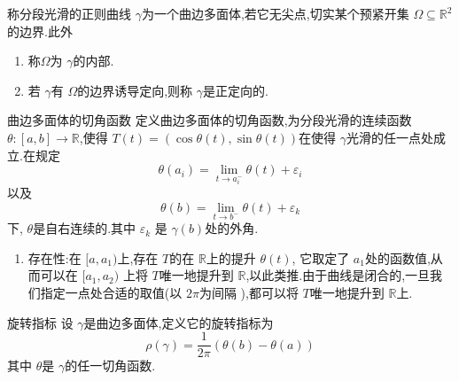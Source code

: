 \documentclass[../../main.tex]{subfiles}
\begin{document}
\begin{definition}
    称分段光滑的正则曲线 \(   \gamma   \)为一个曲边多面体,若它无尖点,切实某个预紧开集 \(   \Omega \subseteq \mathbb{R} ^{2}  \)  的边界.此外
    \begin{enumerate}
        \item 称\(    \Omega   \)为 \(   \gamma   \)的内部.  
        \item 若 \(   \gamma   \)有 \(   \Omega   \)的边界诱导定向,则称 \(   \gamma   \)是正定向的.   
    \end{enumerate}
    
\end{definition}


\begin{definition}{曲边多面体的切角函数}
    定义曲边多面体的切角函数,为分段光滑的连续函数 \(   \theta :\left[ a,b \right]\to \mathbb{R}    \),使得 \(  T\left( t \right)= \left( \cos  \theta \left( t \right),\sin  \theta \left( t \right)   \right)    \)在使得 \(   \gamma   \)光滑的任一点处成立.在规定 \[
     \theta \left( a_{i} \right)= \lim_{t\to a_{i}^{- }}  \theta \left( t \right)+  \varepsilon _{i}  
    \]以及 \[
     \theta \left( b \right)= \lim_{t \to b^{- }} \theta \left( t \right)+  \varepsilon _{k}  
    \]下,     \(   \theta   \)是自右连续的.其中 \(   \varepsilon _{k}  \)  是 \(   \gamma \left( b \right)   \)处的外角. 
\end{definition}

\begin{remark}
    \begin{enumerate}
        \item 存在性:在 \(  [a,a_1)  \)上,存在 \(  T  \)的在 \(  \mathbb{R}   \)上的提升 \(   \theta \left( t \right)   \),    它取定了 \(  a_{1}  \)处的函数值,从而可以在 \(  [a_1,a_2)  \) 上将 \(  T  \)唯一地提升到 \(  \mathbb{R}   \),以此类推.由于曲线是闭合的,一旦我们指定一点处合适的取值(以 \(  2\pi   \)为间隔 ),都可以将 \(  T  \)唯一地提升到 \(  \mathbb{R}   \)上.    
    \end{enumerate}
    
\end{remark}

\begin{definition}{旋转指标}
    设 \(   \gamma   \)是曲边多面体,定义它的旋转指标为 \[
    \rho \left(  \gamma  \right)= \frac{1 }{2\pi  }\left(  \theta \left( b \right)- \theta \left( a \right)   \right)   
    \]其中 \(   \theta   \)是 \(   \gamma   \)的任一切角函数.   
\end{definition}
\end{document}
